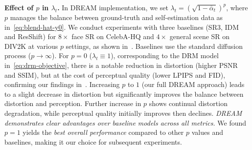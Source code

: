 \textbf{Effect of $p$ in $\lambda_t$.} In DREAM implementation, we set $\lambda_t = (\sqrt{1-\bar{\alpha}_t})^p$, where $p$ manages the balance between ground-truth and self-estimation data as in~\cref{eq:blend-hat-y0}.  We conduct experiments with three baselines (SR3, IDM and ResShift) for $8\times$ face SR on CelebA-HQ and $4\times$ general scene SR on DIV2K at various $p$ settings, as shown in~. Baselines use the standard diffusion process ($p\to\infty$). For $p=0$ ($\lambda_t\equiv1$), corresponding to the DRM model in~\cref{eq:drm-objective}, there is a notable reduction in distortion (higher PSNR and SSIM), but at the cost of perceptual quality (lower LPIPS and FID), confirming our findings in~. Increasing $p$ to $1$ (our full DREAM approach) leads to a slight decrease in distortion but significantly improves the balance between distortion and perception. Further increase in $p$ shows continual distortion degradation, while perceptual quality initially improves then declines. \emph{DREAM demonstrates clear advantages over baseline models across all metrics.} We found $p=1$ yields the \emph{best overall performance} compared to other $p$ values and baselines, making it our choice for subsequent experiments.






